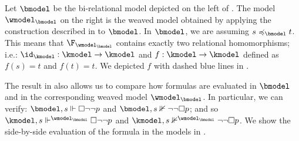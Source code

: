 \begin{example}
  Let $\bmodel$ be the bi-relational model depicted on the left of .
  The model $\wmodel_{\bmodel}$ on the right is the weaved model obtained by applying the construction described in  to $\bmodel$.
  In $\bmodel$, we are assuming $s \preccurlyeq_{\bmodel} t$.
  This means that $\F_{\wmodel_{\bmodel}}$ contains exactly two relational homomorphisms; i.e.: $\id_{\kmodel}: \kmodel \to \kmodel$ and $f: \kmodel \to \kmodel$ defined as $f(s) = t$ and $f(t) = t$.
  We depicted $f$ with dashed blue lines in .
  
  The result in  also allows us to compare how formulas are evaluated in $\bmodel$ and in the corresponding weaved model $\wmodel_{\bmodel}$.
  In particular, we can verify: ${\bmodel, s \Vdash \Box \lnot \lnot p}$ and $\bmodel, s \nVdash \lnot\lnot\Box p$; and so $\kmodel, s \Vdash^{\wmodel_{\bmodel}} \Box \lnot \lnot p$ and ${\kmodel, s \nVdash^{\wmodel_{\bmodel}} \lnot\lnot\Box p}$.
  We show the side-by-side evaluation of the formula in the models in .


\end{example}
